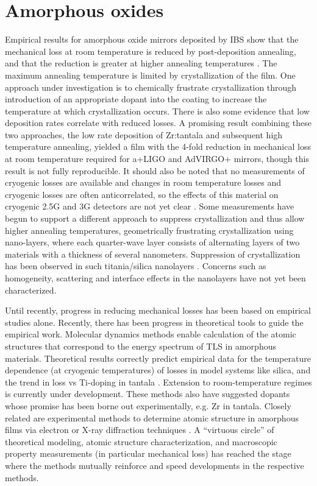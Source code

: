 \section{Amorphous oxides}
Empirical results for amorphous oxide mirrors deposited by IBS show that the mechanical loss at room temperature is reduced by post-deposition annealing, and that the reduction is greater at higher annealing temperatures \cite{vajente2018effect}. The maximum annealing temperature is limited by crystallization of the film. One approach under investigation is to chemically frustrate crystallization through introduction of an appropriate dopant into the coating to increase the temperature at which crystallization occurs. There is also some evidence that low deposition rates correlate with reduced losses. A promising result combining these two approaches, the low rate deposition of Zr:tantala and subsequent high temperature annealing, yielded a film with the 4-fold reduction in mechanical loss at room temperature required for a+LIGO and AdVIRGO+ mirrors, though this result is not fully reproducible. It should also be noted that no measurements of cryogenic losses are available and changes in room temperature losses and cryogenic losses are often anticorrelated, so the effects of this material on cryogenic 2.5G and 3G detectors are not yet clear \cite{martin2010effect}. Some measurements have begun to support a different approach to suppress crystallization and thus allow higher annealing temperatures, geometrically frustrating crystallization using nano-layers, where each quarter-wave layer consists of alternating layers of two materials with a thickness of several nanometers. Suppression of crystallization has been observed in such titania/silica nanolayers \cite{pan2014thickness}. Concerns such as homogeneity, scattering and interface effects in the nanolayers have not yet been characterized. 

Until recently, progress in reducing mechanical losses has been based on empirical studies alone. Recently, there has been progress in theoretical tools to guide the empirical work. Molecular dynamics methods enable calculation of the atomic structures that correspond to the energy spectrum of TLS in amorphous materials. Theoretical results correctly predict empirical data for the temperature dependence (at cryogenic temperatures) of losses in model systems like silica, and the trend in loss vs Ti-doping in tantala \cite{trinastic2016molecular}. Extension to room-temperature regimes is currently under development. These methods also have suggested dopants whose promise has been borne out experimentally, e.g. Zr in tantala. Closely related are experimental methods to determine atomic structure in amorphous films via electron or X-ray diffraction techniques \cite{bassiri2013correlations,hart2016medium,shyam2016measurement}. A “virtuous circle” of theoretical modeling, atomic structure characterization, and macroscopic property measurements (in particular mechanical loss) has reached the stage where the methods mutually reinforce and speed developments in the respective methods.

